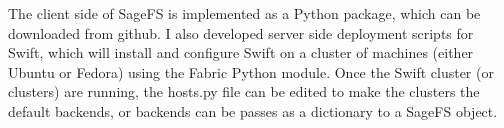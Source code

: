 The client side of SageFS is implemented as a Python package, which can be downloaded from github. I also developed server side deployment scripts for Swift, which will install and configure Swift on a cluster of machines (either Ubuntu or Fedora) using the Fabric Python module. Once the Swift cluster (or clusters) are running, the hosts.py file can be edited to make the clusters the default backends, or backends can be passes as a dictionary to a SageFS object.